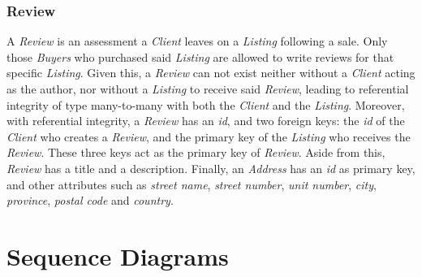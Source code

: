 \documentclass[11pt]{article}
\begin{document}
\subsubsection{Review}
A \textit{Review} is an assessment a \textit{Client} leaves on a \textit{Listing} following a sale. Only those \textit{Buyers} who purchased said \textit{Listing} are allowed to write reviews for that specific \textit{Listing}. Given this, a \textit{Review} can not exist neither without a \textit{Client} acting as the author, nor without a \textit{Listing} to receive said \textit{Review}, leading to referential integrity of type many-to-many with both the \textit{Client} and the \textit{Listing}. Moreover, with referential integrity, a \textit{Review} has an \textit{id}, and two foreign keys: the \textit{id} of the \textit{Client} who creates a \textit{Review}, and the primary key of the \textit{Listing} who receives the \textit{Review}. These three keys act as the primary key of \textit{Review}. Aside from this, \textit{Review} has a title and a description. Finally, an \textit{Address} has an \textit{id} as primary key, and other attributes such as \textit{street name}, \textit{street number}, \textit{unit number}, \textit{city}, \textit{province}, \textit{postal code} and \textit{country}.





\section{Sequence Diagrams}
\end{document}
